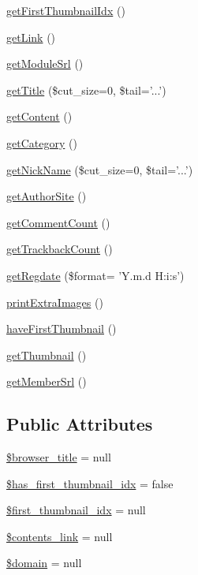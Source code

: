 \begin{DoxyCompactItemize}
\item 
\hyperlink{classcontentItem_a0de8d1dad2347b9f91bc4f16df2c4a12}{get\+First\+Thumbnail\+Idx} ()
\item 
\hyperlink{classcontentItem_a8e5d8c09bab20f5a0cd0874504cf5a5e}{get\+Link} ()
\item 
\hyperlink{classcontentItem_a62686ab7afb76f1239a3824be0e2ded8}{get\+Module\+Srl} ()
\item 
\hyperlink{classcontentItem_aa061be1a76a2d94912440572bd4f875a}{get\+Title} (\$cut\+\_\+size=0, \$tail='...')
\item 
\hyperlink{classcontentItem_adb35fd4206e162bccd6ff9f5ac832e09}{get\+Content} ()
\item 
\hyperlink{classcontentItem_ae5a4e97f8f472805fff31340bc095ff3}{get\+Category} ()
\item 
\hyperlink{classcontentItem_a16947acbbeff208471271acd16d5f8f1}{get\+Nick\+Name} (\$cut\+\_\+size=0, \$tail='...')
\item 
\hyperlink{classcontentItem_ac8050edaeafe9d6a9c3017185a60576d}{get\+Author\+Site} ()
\item 
\hyperlink{classcontentItem_ae2402a7138ef2a2c9dae2d76aa31228f}{get\+Comment\+Count} ()
\item 
\hyperlink{classcontentItem_a197f56732733f1487d26ed23d29e94a6}{get\+Trackback\+Count} ()
\item 
\hyperlink{classcontentItem_a16a589406fd0206a40ec96810ec75ec1}{get\+Regdate} (\$format= 'Y.\+m.\+d H\+:i\+:s')
\item 
\hyperlink{classcontentItem_acdff242f3298021a7ac9274a4191ebc7}{print\+Extra\+Images} ()
\item 
\hyperlink{classcontentItem_a9e7fa4b2b4b3ce4a066d89b7f862be5a}{have\+First\+Thumbnail} ()
\item 
\hyperlink{classcontentItem_a2d0ac2755de034bee02842e1b4b8179c}{get\+Thumbnail} ()
\item 
\hyperlink{classcontentItem_a3356fefc2abd34642fa229f5a150cbdd}{get\+Member\+Srl} ()
\end{DoxyCompactItemize}
\subsection*{Public Attributes}
\begin{DoxyCompactItemize}
\item 
\hyperlink{classcontentItem_abaf3b2f2d6878f8568161f4fce4e80bf}{\$browser\+\_\+title} = null
\item 
\hyperlink{classcontentItem_a78da7867160d34bf7e422524f6a78c37}{\$has\+\_\+first\+\_\+thumbnail\+\_\+idx} = false
\item 
\hyperlink{classcontentItem_a3ed95afadefbe20bd085e1d88220f4b1}{\$first\+\_\+thumbnail\+\_\+idx} = null
\item 
\hyperlink{classcontentItem_a6bf076b1d98025ee3f1d847fcf1fd29f}{\$contents\+\_\+link} = null
\item 
\hyperlink{classcontentItem_a428d40bc2148eae5661822963ba819b4}{\$domain} = null
\end{DoxyCompactItemize}



